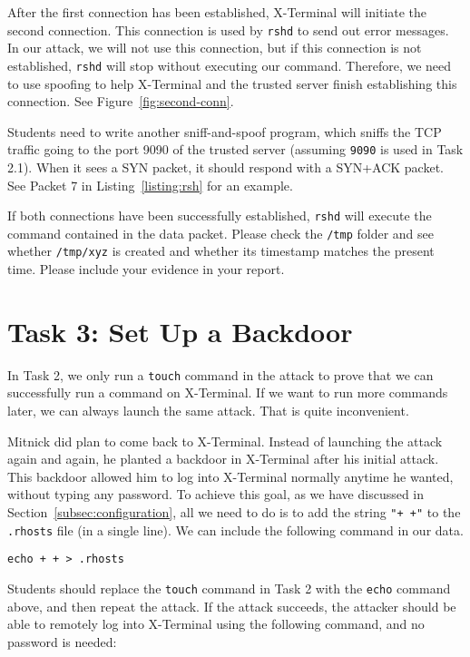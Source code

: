 After the first connection has been established, X-Terminal will initiate 
the second connection. This connection is used by \texttt{rshd} to send 
out error messages. In our attack, we will not use this connection, but
if this connection is not established, \texttt{rshd} will stop without 
executing our command. Therefore, we need to use spoofing 
to help X-Terminal and the trusted server finish establishing this connection. 
See Figure~\ref{fig:second-conn}. 


Students need to write another sniff-and-spoof program, which
sniffs the TCP traffic going to the port 9090 of the trusted server (assuming
\texttt{9090} is used in Task 2.1). When it sees a SYN packet,
it should respond with a SYN+ACK packet. See Packet 7 
in Listing~\ref{listing:rsh} for an example.

If both connections have been successfully established, \texttt{rshd} 
will execute the command contained in the \rsh data packet. Please 
check the \texttt{/tmp} folder and see whether \texttt{/tmp/xyz} is created
and whether its timestamp matches the present time. Please 
include your evidence in your report. 



\section{Task 3: Set Up a Backdoor}

In Task 2, we only run a \texttt{touch} command in the attack to prove that we can
successfully run a command on X-Terminal. If we want to run
more commands later, we can always launch the same attack. That is quite inconvenient. 

Mitnick did plan to come back to X-Terminal. Instead of launching the attack
again and again, he planted a backdoor in X-Terminal after his initial attack. 
This backdoor allowed him to log into X-Terminal normally anytime he wanted, without 
typing any password. 
To achieve this goal, as we have discussed in 
Section~\ref{subsec:configuration}, 
all we need to do is to add the string \texttt{"+ +"} to
the \texttt{.rhosts} file (in a single line). We can
include the following command in our \rsh data.

\begin{lstlisting}
echo + + > .rhosts
\end{lstlisting}

Students should replace the \texttt{touch} command in Task 2 with
the \texttt{echo} command above, and then repeat the attack.   
If the attack succeeds, the attacker should be able to 
remotely log into X-Terminal using the following command,
and no password is needed: 

